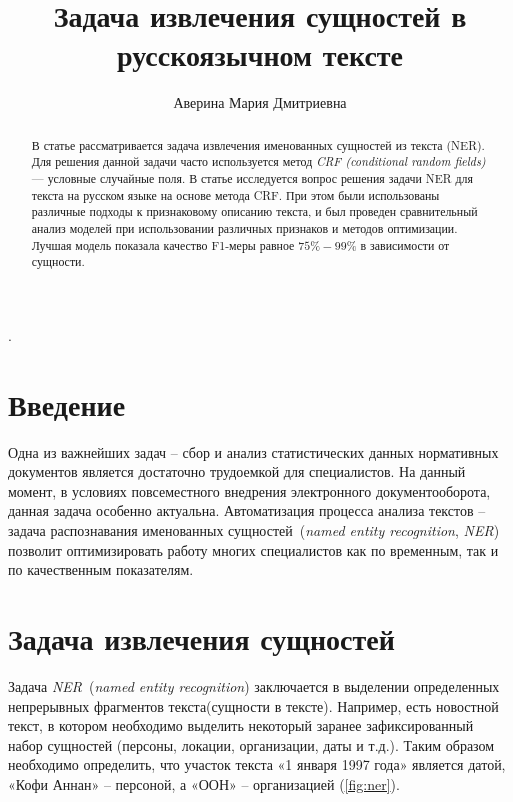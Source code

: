 \documentclass{csmathnotes}
\title{Задача извлечения сущностей в русскоязычном тексте}
\author{Аверина Мария Дмитриевна}
\affiliation{Ярославский государственный университет им. П.\,Г. Демидова}
\begin{document}
\maketitle

\begin{abstract}
В статье рассматривается задача извлечения именованных сущностей из текста (NER).
Для решения данной задачи часто используется метод \emph{CRF (conditional random fields)} --- условные случайные поля.
В статье исследуется вопрос решения задачи NER для текста на русском языке на основе метода CRF.
При этом были использованы различные подходы к признаковому описанию текста, 
и был проведен сравнительный анализ моделей при использовании различных признаков и методов оптимизации.
Лучшая модель показала качество F1-меры равное $75\%-99\%$ в зависимости от сущности.
\end{abstract}

.

\section*{Введение}
Одна из важнейших задач – сбор и анализ статистических данных нормативных
документов является достаточно трудоемкой для специалистов. На данный момент, в условиях повсеместного внедрения электронного документооборота, данная задача особенно актуальна. Автоматизация процесса анализа текстов – задача распознавания именованных сущностей~(\emph{named entity recognition}, \emph{NER})~\cite{base} позволит оптимизировать работу многих специалистов как по временным, так и по качественным показателям.


\section*{Задача извлечения сущностей}

Задача \emph{NER}~(\emph{named entity recognition}) заключается в выделении определенных непрерывных фрагментов текста(сущности в тексте). Например, есть новостной текст, в котором необходимо выделить некоторый заранее зафиксированный набор сущностей (персоны, локации, организации, даты и т.д.). Таким образом необходимо определить, что участок текста «1 января 1997 года» является датой, «Кофи Аннан» – персоной, а «ООН» – организацией (\ref{fig:ner}). 
\end{document}
